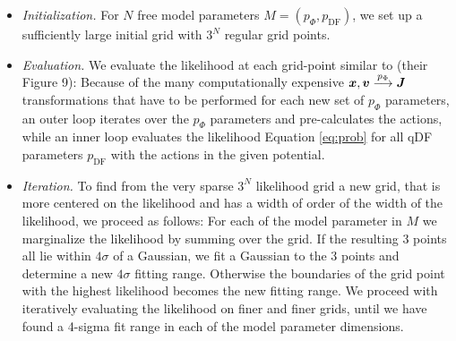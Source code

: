 \begin{itemize}

\item \emph{Initialization.} For $N$ free model parameters $M=(p_\Phi,p_\text{DF})$, we set up a sufficiently large initial grid with $3^N$ regular grid points.

\item  \emph{Evaluation.} We evaluate the likelihood at each grid-point similar to \citet{bov13} (their Figure 9): Because of the many computationally expensive $\boldsymbol{x},\boldsymbol{v} \overset{p_\Phi}{\longrightarrow} \boldsymbol{J}$ transformations that have to be performed for each new set of $p_\Phi$ parameters, an outer loop iterates over the $p_\Phi$ parameters and pre-calculates the actions, while an inner loop evaluates the likelihood Equation \ref{eq:prob} for all qDF parameters $p_\text{DF}$ with the actions in the given potential.

\item \emph{Iteration.} To find from the very sparse $3^N$ likelihood grid a new grid, that is more centered on the likelihood and has a width of order of the width of the likelihood, we proceed as follows: For each of the model parameter in $M$ we marginalize the likelihood by summing over the grid. If the resulting 3 points all lie within $4\sigma$ of a Gaussian, we fit a Gaussian to the 3 points and determine a new $4\sigma$ fitting range. Otherwise the boundaries of the grid point with the highest likelihood becomes the new fitting range. We proceed with iteratively evaluating the likelihood on finer and finer grids, until we have found a 4-sigma fit range in each of the model parameter dimensions.


\end{itemize}
